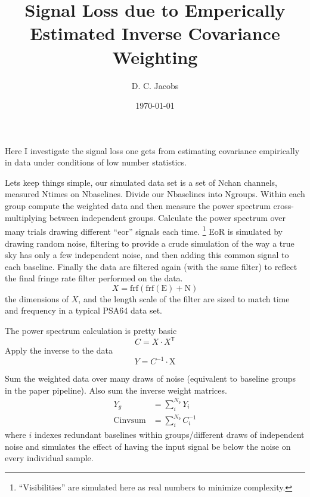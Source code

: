 \documentclass{article}
\begin{document}
\author{D. C. Jacobs}
\title{Signal Loss due to Emperically Estimated Inverse Covariance Weighting}

\date{\today}
\maketitle	

Here I investigate the signal loss one gets from estimating covariance empirically in data under conditions of low number statistics.

Lets keep things simple, our simulated data set is a set of Nchan channels, measured Ntimes on Nbaselines.   Divide our Nbaselines into Ngroups. Within each group compute the weighted data and then measure the power spectrum cross-multiplying between independent groups.  Calculate the power spectrum over many trials drawing different ``eor'' signals each time.  \footnote{``Visibilities'' are simulated here as real numbers to minimize complexity.}  EoR is simulated by drawing random noise, filtering to provide a crude simulation of the way a true sky has only a few independent noise,  and then adding this common signal to each baseline. Finally the data are filtered again (with the same filter) to reflect the final fringe rate filter performed on the data.
\begin{equation}
X = \textrm{frf}(\textrm{frf}(\textrm{E}) + \textrm{N})
\end{equation}
the dimensions of $X$, and the length scale of the filter are sized to match time and frequency in a typical PSA64 data set.


The power spectrum calculation is pretty basic
\begin{equation}
C = X\cdot X^\mathsf{T}
\end{equation}
Apply the inverse to the data
\begin{equation}
Y = C^{-1}\cdot \textrm{X}
\end{equation}

Sum the weighted data over many draws of noise (equivalent to baseline groups in the paper pipeline). Also sum the inverse weight matrices.
\begin{align}
Y_g &= \sum_i^{N_b} Y_i\\
\textrm{Cinvsum} &= \sum_i^{N_b} C_i^{-1}
\end{align}
where $i$ indexes redundant baselines within groups/different draws of independent noise and simulates the effect of having the input signal be below the noise on every individual sample.
\end{document}
